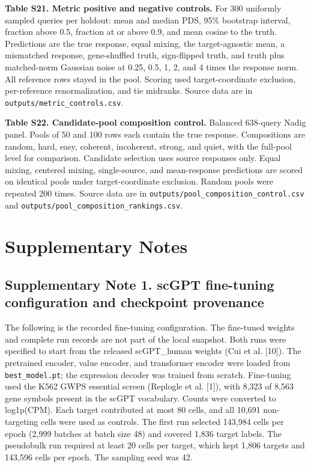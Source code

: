 \documentclass[12pt]{article}
\begin{document}
\begin{singlespace}
\clearpage

\noindent\textbf{Table S21. Metric positive and negative controls.} For 300 uniformly sampled queries per holdout: mean and median PDS, 95\% bootstrap interval, fraction above 0.5, fraction at or above 0.9, and mean cosine to the truth. Predictions are the true response, equal mixing, the target-agnostic mean, a mismatched response, gene-shuffled truth, sign-flipped truth, and truth plus matched-norm Gaussian noise at 0.25, 0.5, 1, 2, and 4 times the response norm. All reference rows stayed in the pool. Scoring used target-coordinate exclusion, per-reference renormalization, and tie midranks. Source data are in \texttt{outputs/metric\_controls.csv}.

\noindent\textbf{Table S22. Candidate-pool composition control.} Balanced 638-query Nadig panel. Pools of 50 and 100 rows each contain the true response. Compositions are random, hard, easy, coherent, incoherent, strong, and quiet, with the full-pool level for comparison. Candidate selection uses source responses only. Equal mixing, centered mixing, single-source, and mean-response predictions are scored on identical pools under target-coordinate exclusion. Random pools were repeated 200 times. Source data are in \texttt{outputs/pool\_composition\_control.csv} and \texttt{outputs/pool\_composition\_rankings.csv}.

\clearpage
\section*{Supplementary Notes}

\subsection*{Supplementary Note 1. scGPT fine-tuning configuration and checkpoint provenance}

The following is the recorded fine-tuning configuration. The fine-tuned weights and complete run records are not part of the local snapshot. Both runs were specified to start from the released scGPT\_human weights (Cui et al. [10]). The pretrained encoder, value encoder, and transformer encoder were loaded from \texttt{best\_model.pt}; the expression decoder was trained from scratch. Fine-tuning used the K562 GWPS essential screen (Replogle et al. [1]), with 8,323 of 8,563 gene symbols present in the scGPT vocabulary. Counts were converted to log1p(CPM). Each target contributed at most 80 cells, and all 10,691 non-targeting cells were used as controls. The first run selected 143,984 cells per epoch (2,999 batches at batch size 48) and covered 1,836 target labels. The pseudobulk run required at least 20 cells per target, which kept 1,806 targets and 143,596 cells per epoch. The sampling seed was 42.


\end{singlespace}
\end{document}
